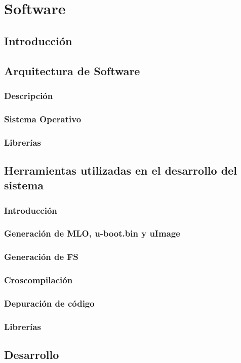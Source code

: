 \chapter{Software}

\section{Introducción}
\section{Arquitectura de Software}
\subsection{Descripción}
\subsection{Sistema Operativo}
\subsection{Librerías}
\section{Herramientas utilizadas en el desarrollo del sistema}
\subsection{Introducción}
\subsection{Generación de MLO, u-boot.bin y uImage}
\subsection{Generación de FS}
\subsection{Croscompilación}
\subsection{Depuración de código}
\subsection{Librerías}
\section{Desarrollo}
